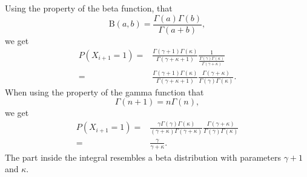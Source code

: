 \documentclass{article}
\begin{document}
Using the property of the beta function, that 
\begin{equation*}
    \text{B}(a,b) = \frac{\Gamma(a)\Gamma(b)}{\Gamma(a+b)},
\end{equation*}
we get
\begin{equation*}
    \begin{aligned}
        P(X_{i+1}=1) 
        =& \frac{\Gamma(\gamma+1)\Gamma(\kappa)}{\Gamma(\gamma+\kappa+1)}
        \frac{1}
        {\frac{\Gamma(\gamma)\Gamma(\kappa)}{\Gamma(\gamma+\kappa)}}\\[6pt]
        =& \frac{\Gamma(\gamma+1)\Gamma(\kappa)}{\Gamma(\gamma+\kappa+1)}
        \frac{\Gamma(\gamma+\kappa)}{\Gamma(\gamma)\Gamma(\kappa)}.
    \end{aligned}
\end{equation*}
When using the property of the gamma function that
\begin{equation*}
    \Gamma(n+1) = n\Gamma(n),
\end{equation*}
we get
\begin{equation*}
    \begin{aligned}
        P(X_{i+1}=1) 
        =& \frac{\gamma \Gamma(\gamma) \Gamma(\kappa)}
        {(\gamma+\kappa)\Gamma(\gamma+\kappa)}
        \frac{\Gamma(\gamma+\kappa)}{\Gamma(\gamma)\Gamma(\kappa)}\\[6pt]
        =& \frac{\gamma}{\gamma+\kappa}.
    \end{aligned}
\end{equation*}
The part inside the integral resembles a beta distribution with parameters $\gamma+1$ and $\kappa$.
\end{document}
